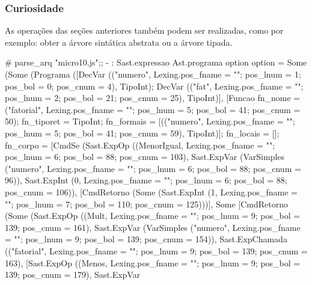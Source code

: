 \documentclass[12pt,a4paper,twoside]{article}
\begin{document}
\subsubsection{Curiosidade}
As operações das seções anteriores também podem ser realizadas, como por exemplo: obter a árvore sintática abstrata ou a árvore tipada.
\begin{terminal}
# parse_arq "micro10.js";;
- : Sast.expressao Ast.programa option option =
Some
 (Some
   (Programa
     ([DecVar
        (("numero",
          {Lexing.pos_fname = ""; pos_lnum = 1; pos_bol = 0; pos_cnum = 4}),
        TipoInt);
       DecVar
        (("fat",
          {Lexing.pos_fname = ""; pos_lnum = 2; pos_bol = 21; pos_cnum = 25}),
        TipoInt)],
     [Funcao
       {fn_nome =
         ("fatorial",
          {Lexing.pos_fname = ""; pos_lnum = 5; pos_bol = 41; pos_cnum = 50});
        fn_tiporet = TipoInt;
        fn_formais =
         [(("numero",
            {Lexing.pos_fname = ""; pos_lnum = 5; pos_bol = 41;
             pos_cnum = 59}),
           TipoInt)];
        fn_locais = [];
        fn_corpo =
         [CmdSe
           (Sast.ExpOp
             ((MenorIgual,
               {Lexing.pos_fname = ""; pos_lnum = 6; pos_bol = 88;
                pos_cnum = 103}),
             Sast.ExpVar
              (VarSimples
                ("numero",
                 {Lexing.pos_fname = ""; pos_lnum = 6; pos_bol = 88;
                  pos_cnum = 96})),
             Sast.ExpInt
              (0,
               {Lexing.pos_fname = ""; pos_lnum = 6; pos_bol = 88;
                pos_cnum = 106})),
           [CmdRetorno
             (Some
               (Sast.ExpInt
                 (1,
                  {Lexing.pos_fname = ""; pos_lnum = 7; pos_bol = 110;
                   pos_cnum = 125})))],
           Some
            [CmdRetorno
              (Some
                (Sast.ExpOp
                  ((Mult,
                    {Lexing.pos_fname = ""; pos_lnum = 9; pos_bol = 139;
                     pos_cnum = 161}),
                  Sast.ExpVar
                   (VarSimples
                     ("numero",
                      {Lexing.pos_fname = ""; pos_lnum = 9; pos_bol = 139;
                       pos_cnum = 154})),
                  Sast.ExpChamada
                   (("fatorial",
                     {Lexing.pos_fname = ""; pos_lnum = 9; pos_bol = 139;
                      pos_cnum = 163}),
                   [Sast.ExpOp
                     ((Menos,
                       {Lexing.pos_fname = ""; pos_lnum = 9; pos_bol = 139;
                        pos_cnum = 179}),
                     Sast.ExpVar
}
\end{terminal}
\end{document}
